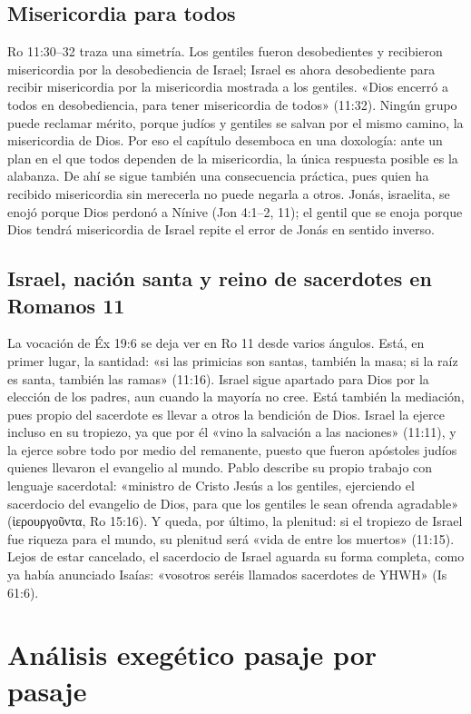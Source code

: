 \documentclass[11pt,letterpaper]{article}
\newcommand{\grc}[1]{\foreignlanguage{ancientgreek}{#1}}
\begin{document}
\subsection{Misericordia para todos}
Ro 11:30--32 traza una simetría. Los gentiles fueron desobedientes y recibieron misericordia por la desobediencia de Israel; Israel es ahora desobediente para recibir misericordia por la misericordia mostrada a los gentiles. «Dios encerró a todos en desobediencia, para tener misericordia de todos» (11:32). Ningún grupo puede reclamar mérito, porque judíos y gentiles se salvan por el mismo camino, la misericordia de Dios. Por eso el capítulo desemboca en una doxología: ante un plan en el que todos dependen de la misericordia, la única respuesta posible es la alabanza. De ahí se sigue también una consecuencia práctica, pues quien ha recibido misericordia sin merecerla no puede negarla a otros. Jonás, israelita, se enojó porque Dios perdonó a Nínive (Jon 4:1--2, 11); el gentil que se enoja porque Dios tendrá misericordia de Israel repite el error de Jonás en sentido inverso.

\subsection{Israel, nación santa y reino de sacerdotes en Romanos 11}
La vocación de Éx 19:6 se deja ver en Ro 11 desde varios ángulos. Está, en primer lugar, la santidad: «si las primicias son santas, también la masa; si la raíz es santa, también las ramas» (11:16). Israel sigue apartado para Dios por la elección de los padres, aun cuando la mayoría no cree. Está también la mediación, pues propio del sacerdote es llevar a otros la bendición de Dios. Israel la ejerce incluso en su tropiezo, ya que por él «vino la salvación a las naciones» (11:11), y la ejerce sobre todo por medio del remanente, puesto que fueron apóstoles judíos quienes llevaron el evangelio al mundo. Pablo describe su propio trabajo con lenguaje sacerdotal: «ministro de Cristo Jesús a los gentiles, ejerciendo el sacerdocio del evangelio de Dios, para que los gentiles le sean ofrenda agradable» (\grc{ἱερουργοῦντα}, Ro 15:16). Y queda, por último, la plenitud: si el tropiezo de Israel fue riqueza para el mundo, su plenitud será «vida de entre los muertos» (11:15). Lejos de estar cancelado, el sacerdocio de Israel aguarda su forma completa, como ya había anunciado Isaías: «vosotros seréis llamados sacerdotes de YHWH» (Is 61:6).

\section{Análisis exegético pasaje por pasaje}\label{sec:exegesis}
\end{document}
